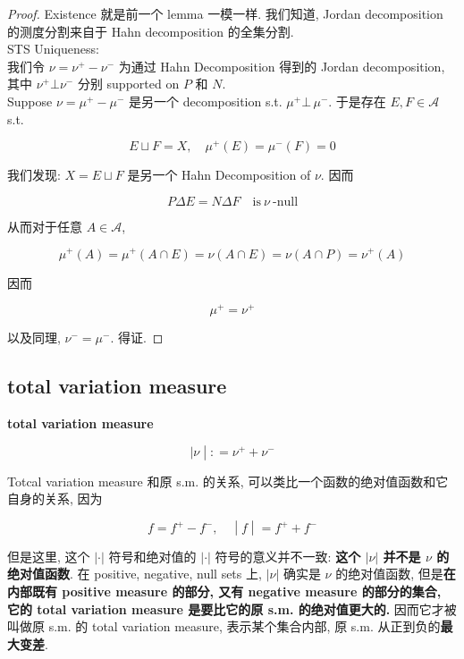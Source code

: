 \documentclass{qlnotes-export}
\begin{document}
\begin{proof}

Existence 就是前一个 lemma 一模一样. 我们知道, Jordan decomposition 的测度分割来自于 Hahn decomposition 的全集分割.\\
STS Uniqueness:\\
我们令 \(\nu = \nu^{+} - \nu^{-}\) 为通过 Hahn Decomposition 得到的 Jordan decomposition, 其中 \(\nu^{+}\bot\nu^{-}\) 分别 supported on \(P\) 和 \(N\).\\
Suppose \(\nu = \mu^{+} - \mu^{-}\) 是另一个 decomposition s.t. \(\mu^{+}\bot\,\mu^{-}\). 于是存在 \(E,F \in \mathcal{A}\) s.t.

\[E \sqcup F = X,\quad\mu^{+}(E) = \mu^{-}(F) = 0\]

我们发现: \(X = E \sqcup F\) 是另一个 Hahn Decomposition of \(\nu\). 因而

\[P\Delta E = N\Delta F\quad\text{is}\ \nu\ \text{-null}\]

从而对于任意 \(A \in \mathcal{A}\),

\[\mu^{+}(A) = \mu^{+}(A \cap E) = \nu(A \cap E) = \nu(A \cap P) = \nu^{+}(A)\]

因而

\[\mu^{+} = \nu^{+}\]

以及同理, \(\nu^{-} = \mu^{-}\). 得证.

\end{proof}

\subsection{total variation measure}\label{total-variation-measure}

\begin{definition}{\protect{}\label{kn-total-variation-measure}{\textbf{total
variation measure}}}

\[\left. |\nu \middle| : = \nu^{+} + \nu^{-} \right.\]

\end{definition}

Totcal variation measure 和原 s.m. 的关系, 可以类比一个函数的绝对值函数和它自身的关系, 因为

\[\left. f = f^{+} - f^{-},\quad \middle| f \middle| = f^{+} + f^{-} \right.\]

但是这里, 这个 \(| \cdot |\) 符号和绝对值的 \(| \cdot |\) 符号的意义并不一致: \textbf{这个 \(|\nu|\) 并不是 \(\nu\) 的绝对值函数}. 在 positive, negative, null sets 上, \(|\nu|\) 确实是 \(\nu\) 的绝对值函数, 但是\textbf{在内部既有 positive measure 的部分, 又有 negative measure 的部分的集合, 它的 total variation measure 是要比它的原 s.m. 的绝对值更大的.} 因而它才被叫做原 s.m. 的 total variation measure, 表示某个集合内部, 原 s.m. 从正到负的\textbf{最大变差}.
\end{document}
